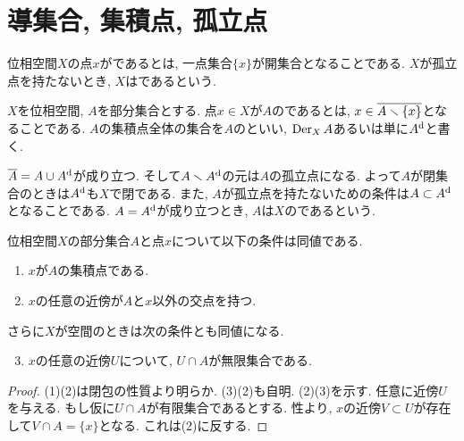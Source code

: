 \documentclass[uplatex, dvipdfmx, a4paper, 12pt, class=jsbook, crop=false]{standalone}
\begin{document}
\section{導集合, 集積点, 孤立点}
\label{sec:derived-sets}

\begin{definition}
	位相空間$ X $の点$ x $がであるとは, 一点集合$ \{x\} $が開集合となることである.
	$ X $が孤立点を持たないとき, $ X $はであるという.
\end{definition}

\begin{definition}
	$ X $を位相空間, $ A $を部分集合とする.
	点$ x \in X $が$ A $のであるとは, $ x \in \overline{A \smallsetminus \{x\}} $となることである.
	$ A $の集積点全体の集合を$ A $のといい, $ \mathop{\mathrm{Der}}\nolimits_X A $あるいは単に$ A^{\mathrm{d}} $と書く.
\end{definition}

$ \overline{A} = A \cup A^{\mathrm{d}} $が成り立つ.
そして$ A \smallsetminus A^{\mathrm{d}} $の元は$ A $の孤立点になる.
よって$ A $が閉集合のときは$ A^{\mathrm{d}} $も$ X $で閉である.
また, $ A $が孤立点を持たないための条件は$ A \subset A^{\mathrm{d}} $となることである.
$ A = A^{\mathrm{d}} $が成り立つとき, $ A $は$ X $のであるという.

\begin{proposition}
	\label{der00001}
	位相空間$ X $の部分集合$ A $と点$ x $について以下の条件は同値である.
	\begin{enumerate}
		\item $ x $が$ A $の集積点である.
		\item $ x $の任意の近傍が$ A $と$ x $以外の交点を持つ.
	\end{enumerate}
	さらに$ X $が空間のときは次の条件とも同値になる.
	\begin{enumerate}
		\setcounter{enumi}{2}
	\item $ x $の任意の近傍$ U $について, $ U \cap A $が無限集合である.
\end{enumerate}
\end{proposition}
\begin{proof}
	(1)\lrimp(2)は閉包の性質より明らか.
	(3)\rimp(2)も自明.
	(2)\rimp(3)を示す.
	任意に近傍$ U $を与える.
	もし仮に$ U \cap A $が有限集合であるとする.
	性より, $ x $の近傍$ V \subset U $が存在して$ V \cap A = \{x\} $となる.
	これは(2)に反する.
\end{proof}
\end{document}

